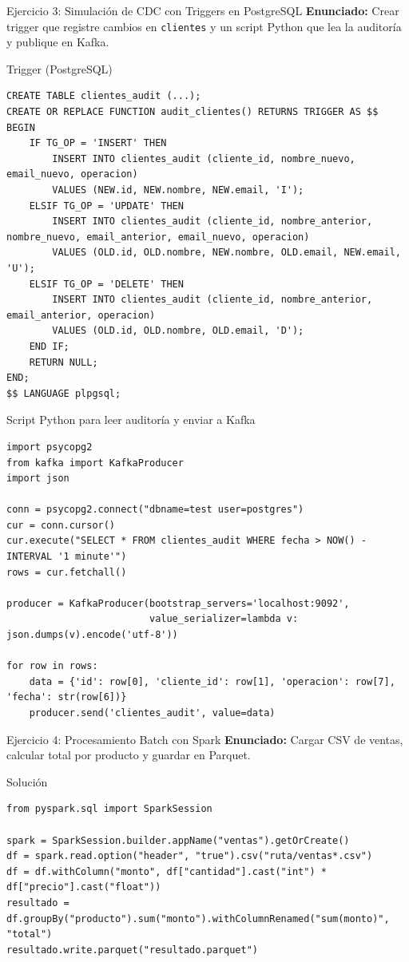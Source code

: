 \documentclass[aspectratio=169, 10pt, xcolor=table]{beamer}
\begin{document}
\begin{frame}[fragile]{Ejercicio 3: Simulación de CDC con Triggers en PostgreSQL}
    \textbf{Enunciado:} Crear trigger que registre cambios en \texttt{clientes} y un script Python que lea la auditoría y publique en Kafka.
    \begin{block}{Trigger (PostgreSQL)}
        \begin{lstlisting}[style=mysql]
CREATE TABLE clientes_audit (...);
CREATE OR REPLACE FUNCTION audit_clientes() RETURNS TRIGGER AS $$
BEGIN
    IF TG_OP = 'INSERT' THEN
        INSERT INTO clientes_audit (cliente_id, nombre_nuevo, email_nuevo, operacion)
        VALUES (NEW.id, NEW.nombre, NEW.email, 'I');
    ELSIF TG_OP = 'UPDATE' THEN
        INSERT INTO clientes_audit (cliente_id, nombre_anterior, nombre_nuevo, email_anterior, email_nuevo, operacion)
        VALUES (OLD.id, OLD.nombre, NEW.nombre, OLD.email, NEW.email, 'U');
    ELSIF TG_OP = 'DELETE' THEN
        INSERT INTO clientes_audit (cliente_id, nombre_anterior, email_anterior, operacion)
        VALUES (OLD.id, OLD.nombre, OLD.email, 'D');
    END IF;
    RETURN NULL;
END;
$$ LANGUAGE plpgsql;
        \end{lstlisting}
    \end{block}
\end{frame}

\begin{frame}[fragile]{Script Python para leer auditoría y enviar a Kafka}
    \begin{lstlisting}[style=python]
import psycopg2
from kafka import KafkaProducer
import json

conn = psycopg2.connect("dbname=test user=postgres")
cur = conn.cursor()
cur.execute("SELECT * FROM clientes_audit WHERE fecha > NOW() - INTERVAL '1 minute'")
rows = cur.fetchall()

producer = KafkaProducer(bootstrap_servers='localhost:9092',
                         value_serializer=lambda v: json.dumps(v).encode('utf-8'))

for row in rows:
    data = {'id': row[0], 'cliente_id': row[1], 'operacion': row[7], 'fecha': str(row[6])}
    producer.send('clientes_audit', value=data)
    \end{lstlisting}
\end{frame}

\begin{frame}[fragile]{Ejercicio 4: Procesamiento Batch con Spark}
    \textbf{Enunciado:} Cargar CSV de ventas, calcular total por producto y guardar en Parquet.
    \begin{block}{Solución}
        \begin{lstlisting}[style=python]
from pyspark.sql import SparkSession

spark = SparkSession.builder.appName("ventas").getOrCreate()
df = spark.read.option("header", "true").csv("ruta/ventas*.csv")
df = df.withColumn("monto", df["cantidad"].cast("int") * df["precio"].cast("float"))
resultado = df.groupBy("producto").sum("monto").withColumnRenamed("sum(monto)", "total")
resultado.write.parquet("resultado.parquet")
        \end{lstlisting}
    \end{block}
\end{frame}
\end{document}
